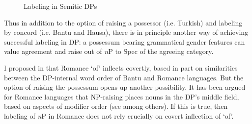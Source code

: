 \documentclass[output=paper
,modfonts
,nonflat]{langsci/langscibook}
\begin{document}
\begin{figure}
\caption{Labeling in Semitic DPs}\label{ex-carstens:54}
\begin{exe}
	\end{exe}
\end{figure} 
\noindent Thus in addition to the option of raising a possessor (i.e. Turkish) and labeling by concord (i.e. Bantu and Hausa), there is in principle another way of achieving successful labeling in DP: a possessum bearing grammatical gender features can value agreement and raise out of \textit{n}P to Spec of the agreeing category.

I proposed in  that Romance ‘of’ inflects covertly, based in part on similarities between the DP-internal word order of Bantu and Romance languages. But the option of raising the possessum opens up another possibility. It has been argued for Romance languages that NP-raising places nouns in the DP’s middle field, based on aspects of modifier order (see \citealt{Laenzlinger2005} among others). If this is true, then labeling of \textit{n}P in Romance does not rely crucially on covert inflection of ‘of’. 
\end{document}
